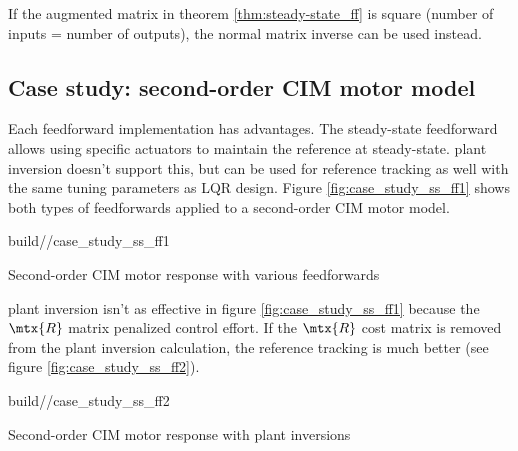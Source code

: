 If the augmented matrix in theorem \ref{thm:steady-state_ff} is square (number
of \glspl{input} = number of \glspl{output}), the normal matrix inverse can be
used instead.

\subsection{Case study: second-order CIM motor model}

Each feedforward implementation has advantages. The steady-state feedforward
allows using specific actuators to maintain the \gls{reference} at steady-state.
\Gls{plant} inversion doesn't support this, but can be used for \gls{reference}
\gls{tracking} as well with the same tuning parameters as LQR design. Figure
\ref{fig:case_study_ss_ff1} shows both types of feedforwards applied to a
second-order CIM motor model.

\begin{svg}{build/\partpath/case_study_ss_ff1}
  \caption{Second-order CIM motor response with various feedforwards}
  \label{fig:case_study_ss_ff1}
\end{svg}

\Gls{plant} inversion isn't as effective in figure \ref{fig:case_study_ss_ff1}
because the $\mtx{R}$ matrix penalized \gls{control effort}. If the $\mtx{R}$
cost matrix is removed from the \gls{plant} inversion calculation, the
\gls{reference} \gls{tracking} is much better (see figure
\ref{fig:case_study_ss_ff2}).

\begin{svg}{build/\partpath/case_study_ss_ff2}
  \caption{Second-order CIM motor response with plant inversions}
  \label{fig:case_study_ss_ff2}
\end{svg}
